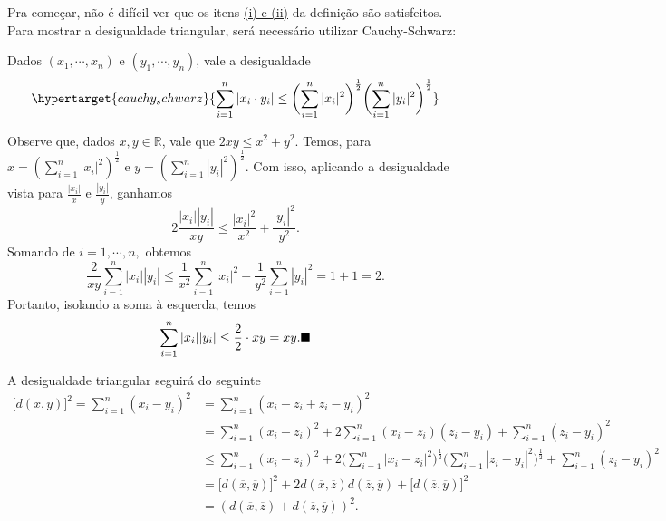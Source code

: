 \documentclass[MetricSpaces/metric_notes.tex]{subfiles}
\begin{document}
Pra começar, não é difícil ver que os itens \hyperlink{def_metric}{(i) e (ii)} da definição são satisfeitos. Para mostrar a desigualdade triangular, será necessário
utilizar Cauchy-Schwarz:
\begin{lemma*}Dados \((x_{1}, \cdots, x_{n})\) e \((y_{1}, \cdots, y_{n})\), vale a desigualdade
	\[
		\hypertarget{cauchy_schwarz}{\sum\limits_{i=1}^{n}|x_{i}\cdot y_{i}|\leq \biggl(\sum\limits_{i=1}^{n}|x_{i}|^{2}\biggr)^{\frac{1}{2}}\biggl(\sum\limits_{i=1}^{n}|y_{i}|^{2}\biggr)^{\frac{1}{2}} }
	\]
\end{lemma*}
\begin{proof*}
	Observe que, dados \(x, y\in \mathbb{R}\), vale que \(2xy\leq x^{2} + y^{2}\).
	Temos, para \(x=(\sum\limits_{i=1}^{n}|x_{i}|^{2})^{\frac{1}{2}}\) e \(y=(\sum\limits_{i=1}^{n}|y_{i}|^{2})^{\frac{1}{2}}\). Com isso, aplicando a desigualdade vista para
	\(\frac{|x_{i}|}{x}\) e \(\frac{|y_{i}|}{y}\), ganhamos
	\[
		2\frac{|x_{i}||y_{i}|}{xy}\leq \frac{|x_{i}|^{2}}{x^{2}} + \frac{|y_{i}|^{2}}{y^{2}}.
	\]
	Somando de \(i=1, \cdots, n,\) obtemos
	\[
		\frac{2}{xy}\sum\limits_{i=1}^{n}|x_{i}||y_{i}| \leq \frac{1}{x^{2}}\sum\limits_{i=1}^{n}|x_{i}|^{2} + \frac{1}{y^{2}}\sum\limits_{i=1}^{n}|y_{i}|^{2} = 1 + 1 = 2.
	\]
	Portanto, isolando a soma à esquerda, temos
	\[
		\sum\limits_{i=1}^{n}|x_{i}||y_{i}|\leq \frac{2}{2}\cdot xy = xy.\text{$\blacksquare$}
	\]
\end{proof*}
A desigualdade triangular seguirá do seguinte
\begin{align*}
	\bigl[d(\overline{x}, \overline{y})\bigr]^{2} = \sum\limits_{i=1}^{n}(x_{i}-y_{i})^{2} & =\sum\limits_{i=1}^{n}(x_{i}-z_{i}+z_{i}-y_{i})^{2}                                                                                                                                                                          \\
	                                                                                       & =\sum\limits_{i=1}^{n}(x_{i}-z_{i})^{2} + 2\sum\limits_{i=1}^{n}(x_{i}-z_{i})(z_{i}-y_{i}) + \sum\limits_{i=1}^{n}(z_{i}-y_{i})^{2}                                                                                          \\
	                                                                                       & \leq \sum\limits_{i=1}^{n}(x_{i}-z_{i})^{2} + 2\biggl(\sum\limits_{i=1}^{n}|x_{i}-z_{i}|^{2}\biggr)^{\frac{1}{2}}\biggl(\sum\limits_{i=1}^{n}|z_{i}-y_{i}|^{2}\biggr)^{\frac{1}{2}} + \sum\limits_{i=1}^{n}(z_{i}-y_{i})^{2} \\
	                                                                                       & =\bigl[d(\overline{x}, \overline{y})\bigl]^{2} + 2 d(\overline{x}, \overline{z})d(\overline{z}, \overline{y}) + \bigl[d(\overline{z}, \overline{y})\bigr]^{2}                                                                \\
	                                                                                       & = (d(\overline{x}, \overline{z})+d(\overline{z}, \overline{y}))^{2}.
\end{align*}
\end{document}
